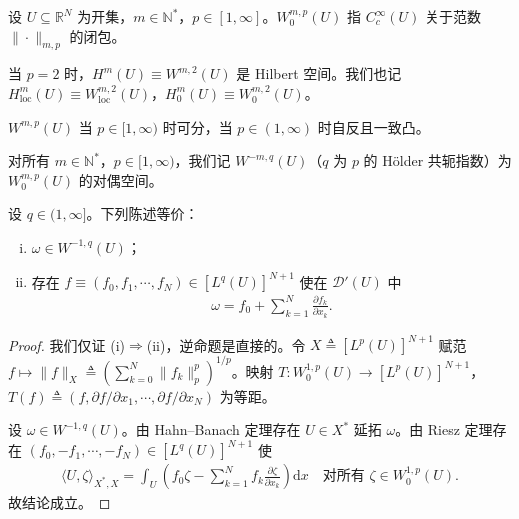 \documentclass[../../main.tex]{subfiles}%
\begin{document}
\begin{definition}\label{definition:ch03-W0}
设 $U\subseteq\mathbb{R}^N$ 为开集，$m\in\mathbb{N}^*$，$p\in[1,\infty]$。$W^{m,p}_0(U)$ 指 $C^\infty_c(U)$ 关于范数 $\|\cdot\|_{m,p}$ 的闭包。
\end{definition}

当 $p=2$ 时，$H^m(U)\equiv W^{m,2}(U)$ 是 Hilbert 空间。我们也记 $H^m_{\mathrm{loc}}(U)\equiv W^{m,2}_{\mathrm{loc}}(U)$，$H^m_0(U)\equiv W^{m,2}_0(U)$。

\begin{theorem}\label{theorem:ch03-Sobolev可分}
$W^{m,p}(U)$ 当 $p\in[1,\infty)$ 时可分，当 $p\in(1,\infty)$ 时自反且一致凸。
\end{theorem}

对所有 $m\in\mathbb{N}^*$，$p\in[1,\infty)$，我们记 $W^{-m,q}(U)$（$q$ 为 $p$ 的 H\"older 共轭指数）为 $W^{m,p}_0(U)$ 的对偶空间。

\begin{proposition}\label{proposition:ch03-W-1q刻画}\label{theorem:ch03-扩散部分H负1}
\label{remark:ch03-H负1测度}
设 $q\in(1,\infty]$。下列陈述等价：
\begin{enumerate}[(i)]
\item $\omega\in W^{-1,q}(U)$；
\item 存在 $f\equiv(f_0,f_1,\cdots ,f_N)\in[L^q(U)]^{N+1}$ 使在 $\mathcal{D}'(U)$ 中
\begin{align*}
\omega=f_0+\sum_{k=1}^N\frac{\partial f_k}{\partial x_k}.
\end{align*}
\end{enumerate}
\end{proposition}

\begin{proof}
我们仅证 (i)$\Rightarrow$(ii)，逆命题是直接的。令 $X\triangleq [L^p(U)]^{N+1}$ 赋范 $f\mapsto\|f\|_X\triangleq (\sum_{k=0}^N\|f_k\|_p^p)^{1/p}$。映射 $T:W^{1,p}_0(U)\to[L^p(U)]^{N+1}$，$T(f)\triangleq (f,\partial f/\partial x_1,\cdots ,\partial f/\partial x_N)$ 为等距。

设 $\omega\in W^{-1,q}(U)$。由 Hahn--Banach 定理存在 $U\in X^*$ 延拓 $\omega$。由 Riesz 定理存在 $(f_0,-f_1,\cdots ,-f_N)\in[L^q(U)]^{N+1}$ 使
\begin{align*}
\langle U,\zeta\rangle_{X^*,X}=\int_U\left(f_0\zeta-\sum_{k=1}^N f_k\frac{\partial\zeta}{\partial x_k}\right)\mathrm{d}x
\quad \text{对所有 }\zeta\in W^{1,p}_0(U).
\end{align*}
故结论成立。
\end{proof}
\end{document}

